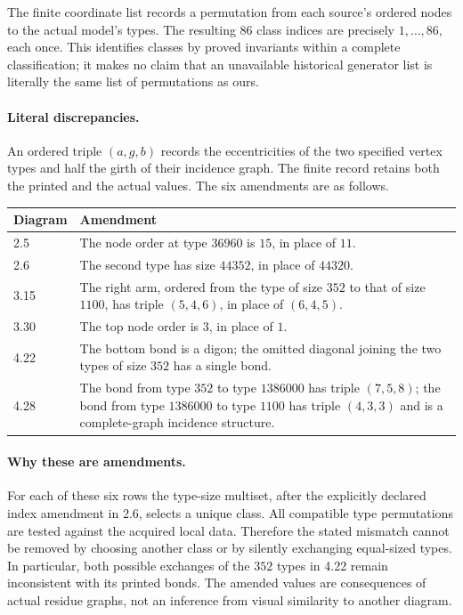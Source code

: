 \documentclass[10pt]{article}
\begin{document}
The finite coordinate list records a permutation from each source's
ordered nodes to the actual model's types. The resulting 86 class
indices are precisely $1,\ldots,86$, each once. This identifies classes
by proved invariants within a complete classification; it makes no
claim that an unavailable historical generator list is literally the
same list of permutations as ours.

\paragraph{Literal discrepancies.}
An ordered triple $(a,g,b)$ records the eccentricities of the two
specified vertex types and half the girth of their incidence graph.
The finite record retains both the printed and the actual values.
The six amendments are as follows.
\begin{center}\begin{tabular}{lp{10.6cm}}
\toprule
Diagram & Amendment\\\midrule
2.5 & The node order at type $36960$ is $15$, in place of $11$.\\
2.6 & The second type has size $44352$, in place of $44320$.\\
3.15 & The right arm, ordered from the type of size $352$ to that of size
$1100$, has triple $(5,4,6)$, in place of $(6,4,5)$.\\
3.30 & The top node order is $3$, in place of $1$.\\
4.22 & The bottom bond is a digon; the omitted diagonal joining the
two types of size $352$ has a single bond.\\
4.28 & The bond from type $352$ to type $1386000$ has triple $(7,5,8)$;
the bond from type $1386000$ to type $1100$ has triple $(4,3,3)$ and
is a complete-graph incidence structure.\\
\bottomrule
\end{tabular}\end{center}

\paragraph{Why these are amendments.}
For each of these six rows the type-size multiset, after the explicitly
declared index amendment in 2.6, selects a unique class. All compatible
type permutations are tested against the acquired local data. Therefore
the stated mismatch cannot be removed by choosing another class or by
silently exchanging equal-sized types. In particular, both possible
exchanges of the $352$ types in 4.22 remain inconsistent with its printed
bonds. The amended values are consequences of actual residue graphs,
not an inference from visual similarity to another diagram.
\end{document}
